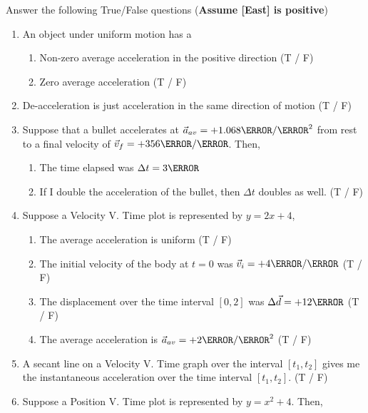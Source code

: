 \documentclass[12pt]{article} %
\begin{document}
\begin{qstn}[1] %
    Answer the following True/False questions (\textbf{Assume [East] is positive})
    \begin{enumerate}
        \item An object under uniform motion has a
            \begin{enumerate}[label = (\alph*)]
                \item Non-zero average acceleration in the positive direction (T / F) 
                \item Zero average acceleration (T / F)
            \end{enumerate}
        \item De-acceleration is just acceleration in the same direction of motion (T / F)
        \item Suppose that a bullet accelerates at $\vec a_{av} = +1.068 \km / \s^2$ from rest to a final velocity of $\vec v_f = +356 \m / \s$. Then,
            \begin{enumerate}[label = (\alph*)]
                \item The time elapsed was $\Delta t = 3\s$
                \item If I double the acceleration of the bullet, then $\Delta t$ doubles as well. (T / F)
            \end{enumerate}
        \item Suppose a Velocity V. Time plot is represented by $y = 2x + 4$,
            \begin{enumerate}[label = (\alph*)]
                \item The average acceleration is uniform (T / F)
                \item The initial velocity of the body at $t = 0$ was $\vec v_i = +4 \m / \s$ (T / F)
                \item The displacement over the time interval $[0,2]$ was $\Delta \vec d = +12\m$ (T / F)
                \item The average acceleration is $\vec a_{av} = +2\m / \s^2$ (T / F)
            \end{enumerate}
        \item A secant line on a Velocity V. Time graph over the interval $[t_1,t_2]$ gives me the instantaneous acceleration over the time interval $[t_1,t_2]$. (T / F)
        \item Suppose a Position V. Time plot is represented by $y = x^2 + 4$. Then,
            \begin{enumerate}[label = (\alph*)]

\end{enumerate}
\end{enumerate}
\end{qstn}
\end{document}
